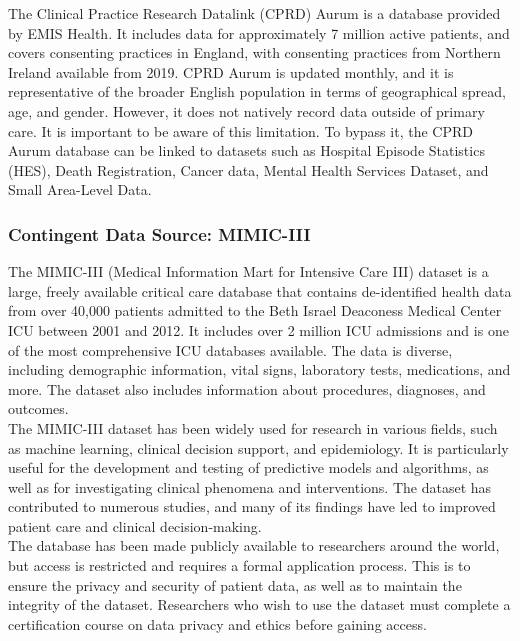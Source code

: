 \documentclass[%
 reprint,
 amsmath,amssymb,
 aps,
 nofootinbib,
]{revtex4-2}
\theoremstyle{definition}
\begin{document}
The Clinical Practice Research Datalink (CPRD) Aurum is a database provided by EMIS Health. It includes data for approximately 7 million active patients, and covers consenting practices in England, with consenting practices from Northern Ireland available from 2019. CPRD Aurum is updated monthly, and it is representative of the broader English population in terms of geographical spread, age, and gender. However, it does not natively record data outside of primary care. It is important to be aware of this limitation. To bypass it, the CPRD Aurum database can be linked to datasets such as Hospital Episode Statistics (HES), Death Registration, Cancer data, Mental Health Services Dataset, and Small Area-Level Data.

\subsubsection{\label{mimiciii} Contingent Data Source: MIMIC-III}

The MIMIC-III (Medical Information Mart for Intensive Care III) dataset is a large, freely available critical care database that contains de-identified health data from over 40,000 patients admitted to the Beth Israel Deaconess Medical Center ICU between 2001 and 2012. It includes over 2 million ICU admissions and is one of the most comprehensive ICU databases available. The data is diverse, including demographic information, vital signs, laboratory tests, medications, and more. The dataset also includes information about procedures, diagnoses, and outcomes.\\

The MIMIC-III dataset has been widely used for research in various fields, such as machine learning, clinical decision support, and epidemiology. It is particularly useful for the development and testing of predictive models and algorithms, as well as for investigating clinical phenomena and interventions. The dataset has contributed to numerous studies, and many of its findings have led to improved patient care and clinical decision-making.\\

The database has been made publicly available to researchers around the world, but access is restricted and requires a formal application process. This is to ensure the privacy and security of patient data, as well as to maintain the integrity of the dataset. Researchers who wish to use the dataset must complete a certification course on data privacy and ethics before gaining access.
\end{document}
